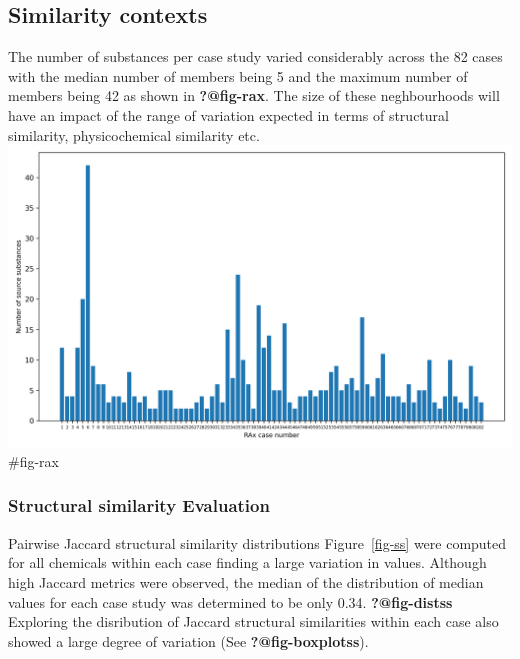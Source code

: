 \documentclass[
  super,
  preprint,
  3p]{elsarticle}
\begin{document}
\subsection{Similarity contexts}\label{similarity-contexts}

The number of substances per case study varied considerably across the
82 cases with the median number of members being 5 and the maximum
number of members being 42 as shown in \textbf{?@fig-rax}. The size of
these neghbourhoods will have an impact of the range of variation
expected in terms of structural similarity, physicochemical similarity
etc. \includegraphics{membership_count.png} \#fig-rax

\subsubsection{Structural similarity
Evaluation}\label{structural-similarity-evaluation}

Pairwise Jaccard structural similarity distributions Figure~\ref{fig-ss}
were computed for all chemicals within each case finding a large
variation in values. Although high Jaccard metrics were observed, the
median of the distribution of median values for each case study was
determined to be only 0.34. \textbf{?@fig-distss} Exploring the
disribution of Jaccard structural similarities within each case also
showed a large degree of variation (See \textbf{?@fig-boxplotss}).
\end{document}
